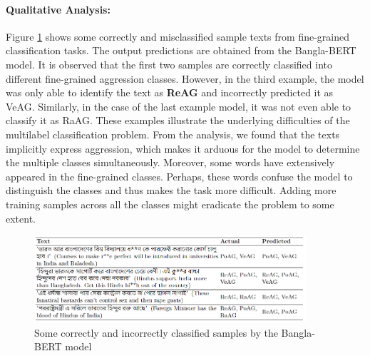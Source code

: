 \documentclass[11pt]{article}
\begin{document}
\paragraph{Qualitative Analysis:} Figure \ref{miss-exam} shows some correctly and misclassified sample texts from fine-grained classification tasks. The output predictions are obtained from the Bangla-BERT model. It is observed that the first two samples are correctly classified into different fine-grained aggression classes. However, in the third example, the model was only able to identify the text as \textbf{ReAG} and incorrectly predicted it as VeAG. Similarly, in the case of the last example model, it was not even able to classify it as RaAG. These examples illustrate the underlying difficulties of the multilabel classification problem. From the analysis, we found that the texts implicitly express aggression, which makes it arduous for the model to determine the multiple classes simultaneously.
Moreover, some words have extensively appeared in the fine-grained classes. Perhaps, these words confuse the model to distinguish the classes and thus makes the task more difficult. Adding more training samples across all the classes might eradicate the problem to some extent.  
      

\begin{figure}[t!]
\centering
\includegraphics[width = 0.9\textwidth]{Figure/qa.PNG}
\caption{Some correctly and incorrectly classified samples by the Bangla-BERT model}
\label{miss-exam}
\end{figure}
\end{document}
